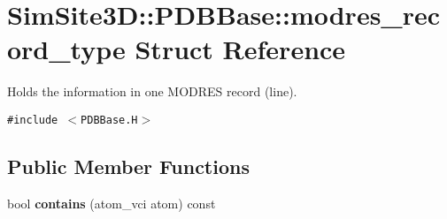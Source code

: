 \section{SimSite3D::PDBBase::modres\_\-record\_\-type Struct Reference}
\label{structSimSite3D_1_1PDBBase_1_1modres__record__type}
Holds the information in one MODRES record (line).  


{\tt \#include $<$PDBBase.H$>$}

\subsection*{Public Member Functions}
\begin{CompactItemize}
\item 
bool \textbf{contains} (atom\_\-vci atom) const \label{structSimSite3D_1_1PDBBase_1_1modres__record__type_8ec38a410ab4be9f8eb84a219628efb3}

\end{CompactItemize}
